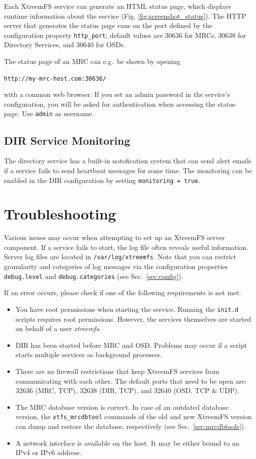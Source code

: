 \documentclass[a4paper,10pt]{book}
\begin{document}
Each XtreemFS service can generate an HTML status page, which displays runtime information about the service (Fig. \ref{fig:screenshot_status}). The HTTP server that generates the status page runs on the port defined by the configuration property \texttt{http\_port}; default values are 30636 for MRCs, 30638 for Directory Services, and 30640 for OSDs.

The status page of an MRC can e.g.\ be shown by opening

\texttt{http://my-mrc-host.com:30636/}

with a common web browser. If you set an admin password in the service's configuration, you will be asked for authentication when accessing the status page. Use \texttt{admin} as username.

\subsection{DIR Service Monitoring}

The directory service has a built-in notofication system that can send alert emails if a service fails to send heartbeat messages for some time. The monitoring can be enabled in the DIR configuration by setting \texttt{monitoring = true}.


\section{Troubleshooting}

Various issues may occur when attempting to set up an XtreemFS server component. If a service fails to start, the log file often reveals useful information. Server log files are located in \texttt{/var/log/xtreemfs}. Note that you can restrict granularity and categories of log messages via the configuration properties \texttt{debug.level} and \texttt{debug.categories} (see Sec.\ \ref{sec:config}).

If an error occurs, please check if one of the following requirements is not met:
\begin{itemize}
 \item You have root permissions when starting the service. Running the \texttt{init.d} scripts requires root permissions. However, the services themselves are started on behalf of a user \textit{xtreemfs}.
 \item DIR has been started before MRC and OSD. Problems may occur if a script starts multiple services as background processes.
 \item There are no firewall restrictions that keep XtreemFS services from communicating with each other. The default ports that need to be open are: 32636 (MRC, TCP), 32638 (DIR, TCP), and 32640 (OSD, TCP \& UDP).
 \item The MRC database version is correct. In case of an outdated database version, the \texttt{xtfs\_mrcdbtool} commands of the old and new XtreemFS version can dump and restore the database, respectively (see Sec.\ \ref{sec:mrcdbtools}).
 \item A network interface is available on the host. It may be either bound to an IPv4 or IPv6 address.
\end{itemize}
\end{document}
